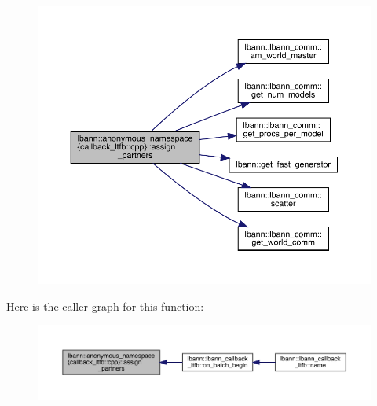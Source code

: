\begin{figure}[H]
\begin{center}
\leavevmode
\includegraphics[width=350pt]{namespacelbann_1_1anonymous__namespace_02callback__ltfb_8cpp_03_a1865e25ff1f3b6ad417d1853ea0bc6f4_cgraph}
\end{center}
\end{figure}
Here is the caller graph for this function\+:\nopagebreak
\begin{figure}[H]
\begin{center}
\leavevmode
\includegraphics[width=350pt]{namespacelbann_1_1anonymous__namespace_02callback__ltfb_8cpp_03_a1865e25ff1f3b6ad417d1853ea0bc6f4_icgraph}
\end{center}
\end{figure}
\mbox{\label{namespacelbann_1_1anonymous__namespace_02callback__ltfb_8cpp_03_a2525bf058156612d7847d0754277e4fc}} 
